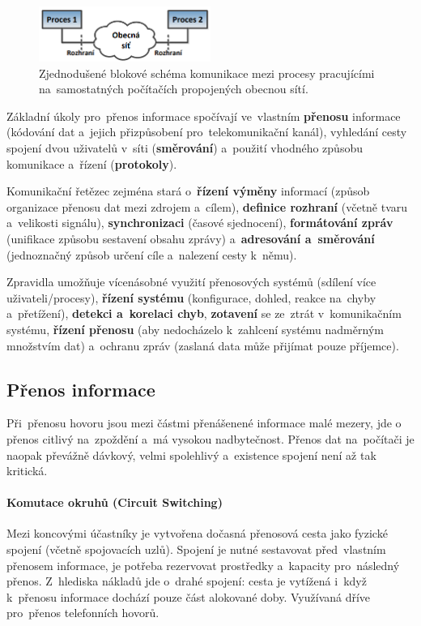 \begin{figure}[ht]
	\centering
	\includegraphics[width=0.5\textwidth]{images/q01_simplified_scheme_processes}
	\caption{Zjednodušené blokové schéma komunikace mezi procesy pracujícími na~samostatných počítačích propojených obecnou sítí.}
	\label{q01_simplified_scheme_processes}
\end{figure}

Základní úkoly pro~přenos informace spočívají ve~vlastním \textbf{přenosu} informace (kódování dat a~jejich přizpůsobení pro~telekomunikační kanál), vyhledání cesty spojení dvou uživatelů v~síti (\textbf{směrování}) a~použití vhodného způsobu komunikace a~řízení (\textbf{protokoly}).

Komunikační řetězec zejména stará o~\textbf{řízení výměny} informací (způsob organizace přenosu dat mezi zdrojem a~cílem), \textbf{definice rozhraní} (včetně tvaru a~velikosti signálu), \textbf{synchronizaci} (časové sjednocení), \textbf{formátování zpráv} (unifikace způsobu sestavení obsahu zprávy) a~\textbf{adresování a~směrování} (jednoznačný způsob určení cíle a~nalezení cesty k~němu).

Zpravidla umožňuje vícenásobné využití přenosových systémů (sdílení více uživateli/procesy), \textbf{řízení systému} (konfigurace, dohled, reakce na~chyby a~přetížení), \textbf{detekci a~korelaci chyb}, \textbf{zotavení} se ze~ztrát v~komunikačním systému, \textbf{řízení přenosu} (aby nedocházelo k~zahlcení systému nadměrným množstvím dat) a~ochranu zpráv (zaslaná data může přijímat pouze příjemce).

\subsection{Přenos informace}

Při~přenosu hovoru jsou mezi částmi přenášenené informace malé mezery, jde o přenos citlivý na~zpoždění a~má vysokou nadbytečnost. Přenos dat na~počítači je naopak převážně dávkový, velmi spolehlivý a~existence spojení není až tak kritická.

\paragraph{Komutace okruhů (Circuit Switching)} Mezi koncovými účastníky je vytvořena dočasná přenosová cesta jako fyzické spojení (včetně spojovacích uzlů). Spojení je nutné sestavovat před~vlastním přenosem informace, je potřeba rezervovat prostředky a~kapacity pro~následný přenos. Z~hlediska nákladů jde o~drahé spojení: cesta je vytížená i~když k~přenosu informace dochází pouze část alokované doby. Využívaná dříve pro~přenos telefonních hovorů.

